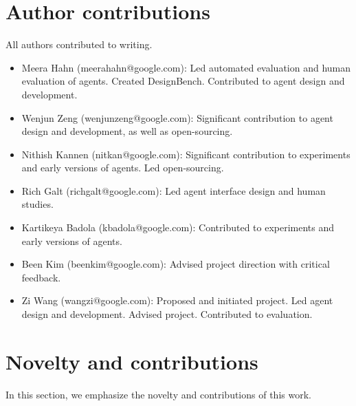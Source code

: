 \newpage

\section{Author contributions}
\label{sec:authors}
All authors contributed to writing.
\begin{itemize}[leftmargin=*]
    \item Meera Hahn (meerahahn@google.com): Led automated evaluation and human evaluation of agents. Created DesignBench. Contributed to agent design and development.
    \item Wenjun Zeng (wenjunzeng@google.com): Significant contribution to agent design and development, as well as open-sourcing.
    \item Nithish Kannen (nitkan@google.com): Significant contribution to experiments and early versions of agents. Led open-sourcing.
    \item Rich Galt (richgalt@google.com): Led agent interface design and human studies.
    \item Kartikeya Badola (kbadola@google.com): Contributed to experiments and early versions of agents.
    \item Been Kim (beenkim@google.com): Advised project direction with critical feedback.
    \item Zi Wang (wangzi@google.com): Proposed and initiated project. Led agent design and development. Advised project. Contributed to evaluation.
\end{itemize}







\section{Novelty and contributions}
\label{app:novelty}
In this section, we emphasize the novelty and contributions of this work.

